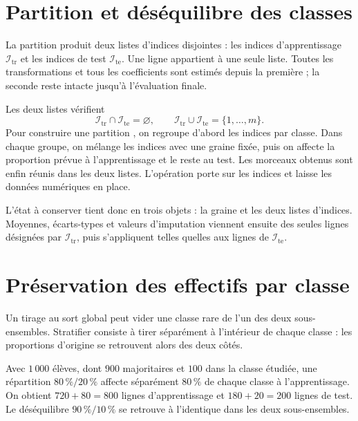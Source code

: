 \section{Partition et déséquilibre des classes}

\begin{lecture}
La partition produit deux listes d'indices disjointes : les indices
d'apprentissage $\mathcal I_{\mathrm{tr}}$ et les indices de test
$\mathcal I_{\mathrm{te}}$. Une ligne appartient à une seule liste. Toutes les
transformations et tous les coefficients sont estimés depuis la première ; la
seconde reste intacte jusqu'à l'évaluation finale.
\end{lecture}

Les deux listes vérifient
\[
  \mathcal I_{\mathrm{tr}}\cap\mathcal I_{\mathrm{te}}=\varnothing,
  \qquad
  \mathcal I_{\mathrm{tr}}\cup\mathcal I_{\mathrm{te}}=\{1,\ldots,m\}.
\]
Pour construire une partition , on regroupe d'abord les indices par
classe. Dans chaque groupe, on mélange les indices avec une graine fixée, puis on
affecte la proportion prévue à l'apprentissage et le reste au test. Les morceaux
obtenus sont enfin réunis dans les deux listes. L'opération porte sur les indices
et laisse les données numériques en place.

L'état à conserver tient donc en trois objets : la graine et les deux listes
d'indices. Moyennes, écarts-types et valeurs d'imputation viennent ensuite des
seules lignes désignées par $\mathcal I_{\mathrm{tr}}$, puis s'appliquent telles
quelles aux lignes de $\mathcal I_{\mathrm{te}}$.

\section{Préservation des effectifs par classe}

\begin{lecture}
Un tirage au sort global peut vider une classe rare de l'un des deux
sous-ensembles. Stratifier consiste à tirer séparément à l'intérieur de chaque
classe : les proportions d'origine se retrouvent alors des deux côtés.
\end{lecture}

Avec $1\,000$ élèves, dont $900$ majoritaires et $100$ dans la classe étudiée,
une répartition $80\,\%/20\,\%$ affecte séparément $80\,\%$ de chaque classe à
l'apprentissage. On obtient $720+80=800$ lignes d'apprentissage et
$180+20=200$ lignes de test. Le déséquilibre $90\,\%/10\,\%$ se retrouve à
l'identique dans les deux sous-ensembles.

